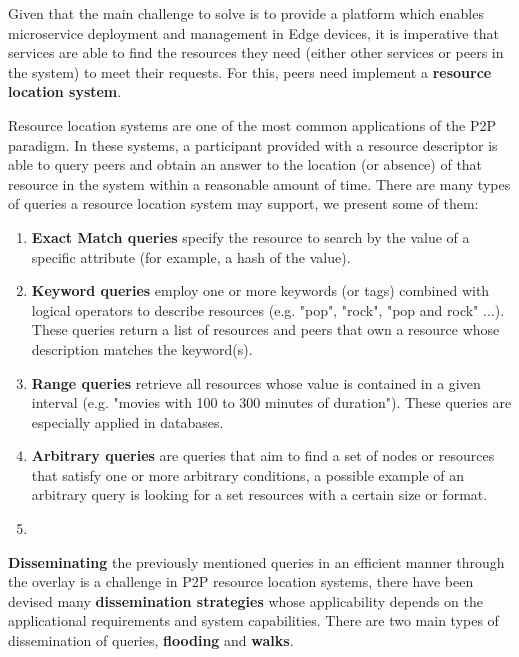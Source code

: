

Given that the main challenge to solve is to provide a platform which enables microservice deployment and management in Edge devices, it is imperative that services are able to find the resources they need (either other services or peers in the system) to meet their requests. For this, peers need implement a \textbf{resource location system}.

Resource location systems are one of the most common applications of the P2P paradigm. In these systems, a participant provided with a resource descriptor is able to query peers and obtain an answer to the location (or absence) of that resource in the system within a reasonable amount of time. There are many types of queries a resource location system may support, we present some of them:

\begin{enumerate}
    \item \textbf{Exact Match queries} specify the resource to search by the value of a specific attribute (for example, a hash of the value).

    \item \textbf{Keyword queries} employ one or more keywords (or tags) combined with logical operators to describe resources (e.g. "pop", "rock", "pop and rock" ...). These queries return a list of resources and peers that own a resource whose description matches the keyword(s).
    
    \item \textbf{Range queries} retrieve all resources whose value is contained in a given interval (e.g. "movies with 100 to 300 minutes of duration"). These queries are especially applied in databases.
    
    \item \textbf{Arbitrary queries} are queries that aim to find a set of nodes or resources that satisfy one or more arbitrary conditions, a possible example of an arbitrary query is looking for a set resources with a certain size or format.
    \item 
\end{enumerate}

\textbf{Disseminating} the previously mentioned queries in an efficient manner through the overlay is a challenge in P2P resource location systems, there have been devised many \textbf{dissemination strategies} whose applicability depends on the applicational requirements and system capabilities. There are two main types of dissemination of queries, \textbf{flooding} and \textbf{walks}.

